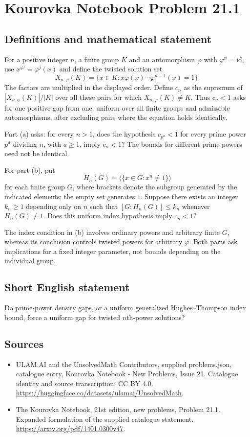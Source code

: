 \documentclass[11pt,a4paper]{article}
\begin{document}
\section*{Kourovka Notebook Problem 21.1}\label{statement}

\subsection{Definitions and mathematical statement}
For a positive integer $n$, a finite group $K$ and an automorphism
$\varphi$ with $\varphi^n=\mathrm{id}$, use $x^{\varphi^j}=\varphi^j(x)$
and define the twisted solution set
\[
 X_{n,\varphi}(K)=\{x\in K:x\varphi(x)\cdots\varphi^{n-1}(x)=1\}.
\]
The factors are multiplied in the displayed order. Define $c_n$ as the
supremum of $|X_{n,\varphi}(K)|/|K|$ over all these pairs for which
$X_{n,\varphi}(K)\ne K$. Thus $c_n<1$ asks for one positive gap from
one, uniform over all finite groups and admissible automorphisms, after
excluding pairs where the equation holds identically.

Part (a) asks: for every $n>1$, does the hypothesis $c_{p^a}<1$ for
every prime power $p^a$ dividing $n$, with $a\ge1$, imply $c_n<1$?
The bounds for different prime powers need not be identical.

For part (b), put
\[
 H_n(G)=\langle\{x\in G:x^n\ne1\}\rangle
\]
for each finite group $G$, where brackets denote the subgroup generated
by the indicated elements; the empty set generates $1$.
Suppose there exists an integer $k_n\ge1$ depending only on $n$ such
that $[G:H_n(G)]\le k_n$ whenever $H_n(G)\ne1$.
Does this uniform index hypothesis imply $c_n<1$?

The index condition in (b) involves ordinary powers and arbitrary finite
$G$, whereas its conclusion controls twisted powers for arbitrary
$\varphi$. Both parts ask implications for a fixed integer parameter,
not bounds depending on the individual group.
\subsection{Short English statement}
Do prime-power density gaps, or a uniform generalized Hughes–Thompson index bound, force a uniform gap for twisted $n$th-power solutions?
\subsection{Sources}
\begin{itemize}
\item[S1] ULAM.AI and the UnsolvedMath Contributors, supplied problems.json, catalogue entry, Kourovka Notebook - New Problems, Issue 21. Catalogue identity and source transcription; CC BY 4.0.
\url{https://huggingface.co/datasets/ulamai/UnsolvedMath}.
\item[S2] The Kourovka Notebook, 21st edition, new problems, Problem 21.1. Expanded formulation of the supplied catalogue statement.
\url{https://arxiv.org/pdf/1401.0300v47}.
\end{itemize}
\end{document}
